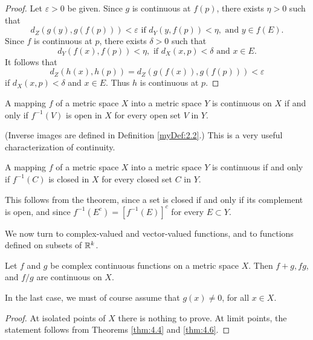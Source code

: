 \begin{proof}
    Let $\varepsilon > 0$ be given. Since $g$ is continuous at $f(p)$, there exists $\eta > 0$ such that 
    \begin{equation*}
        d_Z(g(y), g(f(p))) < \varepsilon \text{ if } d_Y(y,f(p)) < \eta, \text{ and } y \in f(E).
    \end{equation*}
Since $f$ is continuous at $p$, there exists $\delta > 0$ such that
\begin{equation*}
    d_Y(f(x),f(p)) < \eta, \text{ if } d_X(x, p) <\delta \text{ and } x \in E.
\end{equation*}
It follows that
\begin{equation*}
    d_Z(h(x), h(p)) = d_Z(g(f(x)), g(f(p))) < \varepsilon
\end{equation*}
if $d_X(x, p) < \delta$ and $x \in E$. Thus $h$ is continuous at $p$.
\end{proof}

\begin{thm}
    \label{thm:4.8}
    A mapping $f$ of a metric space $X$ into a metric space $Y$ is continuous on $X$ if and only if $f^{-1}(V)$ is open in $X$ for every open set $V$ in $Y$.
\end{thm}

(Inverse images are defined in Definition \ref{myDef:2.2}.) 
This is a very useful characterization of continuity.

\begin{myCorollary}
    A mapping $f$ of a metric space $X$ into a metric space $Y$ is continuous if and only if $f^{-1} (C)$ is closed in $X$ for every closed set $C$ in $Y$.
\end{myCorollary}

This follows from the theorem, since a set is closed if and only if its complement is open, and since $f^{-1}(E^c) = [f^{-1}(E)]^c$ for every $E \subset Y$.

We now turn to complex-valued and vector-valued functions, and to
functions defined on subsets of ${\protect\mathbb R}^{k}$.

\begin{thm}
    \label{thm:4.9}
    Let $f$ and $g$ be complex continuous functions on a metric space $X$.
    Then $f + g,fg$, and $f/g$ are continuous on $X$.
    
    In the last case, we must of course assume that $g(x) \neq 0$, for all $x \in  X$.
\end{thm}
\begin{proof}
    At isolated points of $X$ there is nothing to prove. At limit points,
    the statement follows from Theorems \ref{thm:4.4} and \ref{thm:4.6}.
\end{proof}

